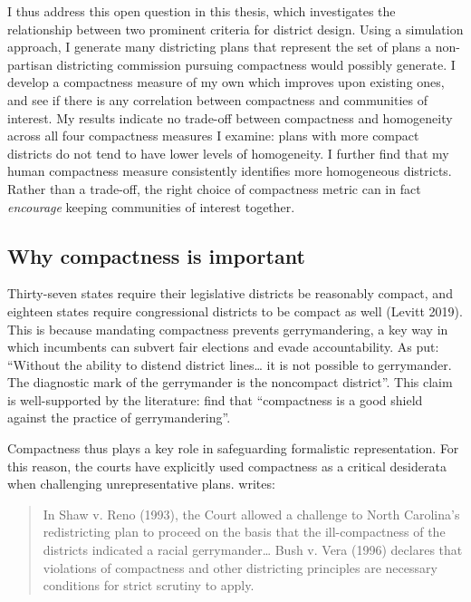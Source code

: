 \documentclass[]{article}
\begin{document}
I thus address this open question in this thesis, which investigates the
relationship between two prominent criteria for district design. Using a
simulation approach, I generate many districting plans that represent
the set of plans a non-partisan districting commission pursuing
compactness would possibly generate. I develop a compactness measure of
my own which improves upon existing ones, and see if there is any
correlation between compactness and communities of interest. My results
indicate no trade-off between compactness and homogeneity across all
four compactness measures I examine: plans with more compact districts
do not tend to have lower levels of homogeneity. I further find that my
human compactness measure consistently identifies more homogeneous
districts. Rather than a trade-off, the right choice of compactness
metric can in fact \emph{encourage} keeping communities of interest
together.

\hypertarget{why-compactness-is-important}{%
\subsection{Why compactness is
important}\label{why-compactness-is-important}}

Thirty-seven states require their legislative districts be reasonably
compact, and eighteen states require congressional districts to be
compact as well (Levitt 2019). This is because mandating compactness
prevents gerrymandering, a key way in which incumbents can subvert fair
elections and evade accountability. As \cite{pp1991} put: ``Without the
ability to distend district lines\ldots{} it is not possible to
gerrymander. The diagnostic mark of the gerrymander is the noncompact
district''. This claim is well-supported by the literature:
\cite{apollonio2006} find that ``compactness is a good shield against
the practice of gerrymandering''.

Compactness thus plays a key role in safeguarding formalistic
representation. For this reason, the courts have explicitly used
compactness as a critical desiderata when challenging unrepresentative
plans. \cite{altman1998} writes:

\begin{quote}
In Shaw v. Reno (1993), the Court allowed a challenge to North
Carolina's redistricting plan to proceed on the basis that the
ill-compactness of the districts indicated a racial gerrymander\ldots{}
Bush v. Vera (1996) declares that violations of compactness and other
districting principles are necessary conditions for strict scrutiny to
apply.
\end{quote}
\end{document}

